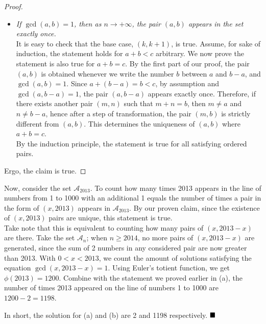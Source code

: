 \documentclass[11pt]{article}
\newenvironment{solution}[1][Solution]{%
  \proof[\normalfont \faPenNib \hspace{0.2cm} \ttfamily \scshape \large #1]%
}{\(\hfill \blacksquare\){\parfillskip0pt\par}}
\theoremstyle{definition}
\begin{document}
\begin{solution}
\begin{enumerate}
\begin{proof}
\begin{itemize}
                        \item \textit{If \(\gcd(a,b) = 1\), then as \(n \to +\infty\), the pair \((a,b)\) appears in the set exactly once.}\\
                        It is easy to check that the base case, \((k,k+1)\), is true. Assume, for sake of induction, the statement holds for \(a + b < c\) arbitrary. We now prove the statement is also true for \(a + b = c\). By the first part of our proof, the pair \((a,b)\) is obtained whenever we write the number \(b\) between \(a\) and \(b - a\), and \(\gcd(a,b) = 1\). Since \(a + (b - a) = b < c\), by assumption and \(\gcd(a,b - a) = 1\), the pair \((a,b - a)\) appears exactly once. Therefore, if there exists another pair \((m,n)\) such that \(m + n = b\), then \(m \neq a\) and \(n \neq b - a\), hence after a step of transformation, the pair \((m,b)\) is strictly different from \((a,b)\). This determines the uniqueness of \((a,b)\) where \(a + b = c\).\\
                        By the induction principle, the statement is true for all satisfying ordered pairs.
                    \end{itemize}

                    Ergo, the claim is true.
                \end{proof}
                
                Now, consider the set \(\mathcal{A}_{2013}\). To count how many times 2013 appears in the line of numbers from 1 to 1000 with an additional 1 equals the number of times a pair in the form of \((x,2013)\) appears in \(\mathcal{A}_{2013}\). By our proven claim, since the existence of \((x,2013)\) pairs are unique, this statement is true.\\
                Take note that this is equivalent to counting how many pairs of \((x,2013 - x)\) are there. Take the set \(\mathcal{A}_n\); when \(n \geq 2014\), no more pairs of \((x,2013 - x)\) are generated, since the sum of 2 numbers in any considered pair are now greater than 2013. With \(0 < x < 2013\), we count the amount of solutions satisfying the equation \(\gcd(x,2013 - x) = 1\). Using Euler's totient function, we get \(\phi(2013) = 1200\). Combine with the statement we proved earlier in (a), the number of times 2013 appeared on the line of numbers 1 to 1000 are \(1200 - 2 = 1198\).
            \end{enumerate}
            In short, the solution for (a) and (b) are 2 and 1198 respectively.
        \end{solution}
\end{document}
